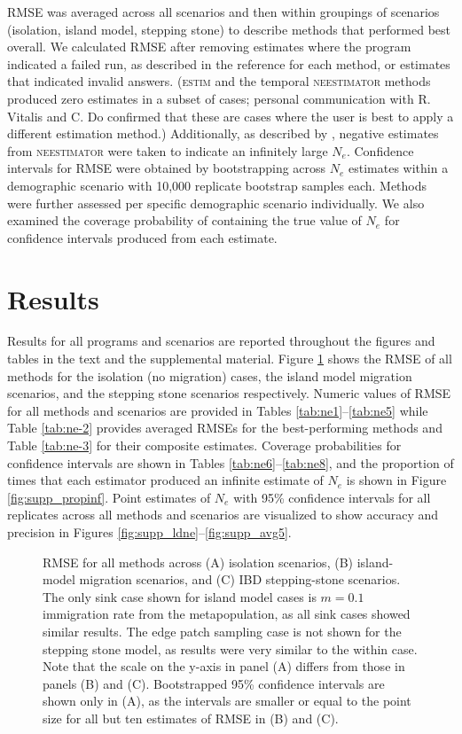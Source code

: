 RMSE was averaged across all scenarios and then within groupings of scenarios 
(isolation, island model, stepping stone) to describe methods that performed best overall. 
We calculated RMSE after removing estimates where the program indicated a failed run, as 
described in the reference for each method, or estimates that indicated invalid answers. (\textsc{estim} and the
temporal \textsc{neestimator} methods produced zero estimates in a subset of cases; 
personal communication with R. Vitalis and C. Do confirmed that these are cases where the 
user is best to apply a different estimation method.) Additionally, as described by \citet{Do:2014}, 
negative estimates from \textsc{neestimator} were taken to indicate an infinitely large $N_e$. 
Confidence intervals for RMSE were obtained by bootstrapping across $N_e$ estimates within a 
demographic scenario with 10,000 replicate bootstrap samples each. Methods were further assessed per 
specific demographic scenario individually. We also examined the coverage probability of containing 
the true value of $N_e$ for confidence intervals produced from each estimate.

\section{Results}
Results for all programs and scenarios are reported throughout the figures and tables in the text 
and the supplemental material. Figure \ref{fig:ne-2} shows the RMSE of all methods for the isolation (no migration) 
cases, the island model migration scenarios, and the stepping stone scenarios respectively. Numeric 
values of RMSE for all methods and scenarios are provided in Tables \ref{tab:ne1}--\ref{tab:ne5} while Table \ref{tab:ne-2} provides 
averaged RMSEs for the best-performing methods and Table \ref{tab:ne-3} for their composite estimates. 
Coverage probabilities for confidence intervals are shown in Tables \ref{tab:ne6}--\ref{tab:ne8}, and the proportion 
of times that each estimator produced an infinite estimate of $N_e$ is shown in Figure \ref{fig:supp_propinf}. 
Point estimates of $N_e$ with 95\% confidence intervals for all replicates across all 
methods and scenarios are visualized to show accuracy and precision in Figures \ref{fig:supp_ldne}--\ref{fig:supp_avg5}.

\begin{figure}[]
\centering
{}
\caption[~- RMSE for all methods across all scenarios.]{RMSE for all methods across (A) isolation scenarios, (B) island-model migration scenarios, and (C) 
IBD stepping-stone scenarios. The only sink case shown for island model cases is $m = 0.1$ immigration rate from 
the metapopulation, as all sink cases showed similar results. The edge patch sampling case is not shown for 
the stepping stone model, as results were very similar to the within case. Note that the scale on the y-axis 
in panel (A) differs from those in panels (B) and (C). Bootstrapped 95\% confidence intervals are shown only 
in (A), as the intervals are smaller or equal to the point size for all but ten estimates of RMSE in (B) and (C).}
\label{fig:ne-2}
\end{figure}

